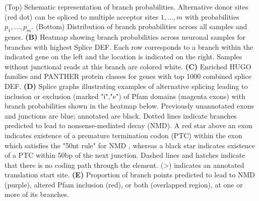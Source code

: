  (Top) Schematic representation of branch probabilities. Alternative donor sites (red dot) can be spliced to multiple acceptor sites $1,\ldots, m$ with probabilities $p_{1},\ldots,p_{m}$. (Bottom) Distribution of branch probabilities across all samples and genes. \textbf{(B)} Heatmap showing branch probabilities across neuronal samples for branches with highest Splice DEF. Each row corresponds to a branch within the indicated gene on the left and the location is indicated on the right. Samples without junctional reads at this branch are colored white. \textbf{(C)} Enriched HUGO families and PANTHER protein classes for genes with top 1000 combined splice DEF. \textbf{(D)} Splice graphs illustrating examples of alternative splicing leading to inclusion or exclusion (marked "i","e") of Pfam domains (magenta exons) with branch probabilities shown in the heatmap below. Previously unannotated exons and junctions are blue; annotated are black. Dotted lines indicate branches predicted to lead to nonsense-mediated decay (NMD). A red star above an exon indicates existence of a premature termination codon (PTC) within the exon which satisfies the "50nt rule" for NMD \citep{Nagy_1998}, whereas a black star indicates existence of a PTC within 50bp of the next junction. Dashed lines and hatches indicate that there is no coding path through the element. (>) indicates an annotated translation start site. \textbf{(E)} Proportion of branch points predicted to lead to NMD (purple), altered Pfam inclusion (red), or both (overlapped region), at one or more of its branches.
